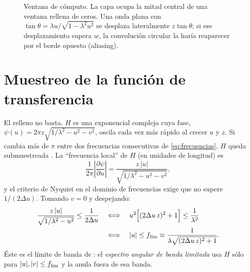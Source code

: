 \begin{figure}[htb]
\centering
{}
\caption[Ventana de cómputo y límite de banda]{Ventana de cómputo. La capa ocupa la mitad
central de una ventana rellena de ceros. Una onda plana con $\tan\theta=\lambda u/\sqrt{1-\lambda^2u^2}$ se
desplaza lateralmente $z\tan\theta$; si ese desplazamiento supera $w$, la convolución circular
la haría reaparecer por el borde opuesto (aliasing).}
\label{fig:ventana}
\end{figure}

\section{Muestreo de la función de transferencia}\label{sec:aliasing}

El relleno no basta. $H$ es una exponencial compleja cuya fase,
$\psi(u)=2\pi z\sqrt{1/\lambda^2-u^2-v^2}$, oscila cada vez más rápido al crecer $u$ y $z$. Si
cambia más de $\pi$ entre dos frecuencias consecutivas de \eqref{eq:frecuencias}, $H$ queda
submuestreada \parencite{voelz2009}. La ``frecuencia local'' de $H$ (en unidades de
longitud) es
\begin{equation}
  \frac{1}{2\pi}\left|\frac{\partial\psi}{\partial u}\right|
  =\frac{z\,|u|}{\sqrt{1/\lambda^2-u^2-v^2}} ,
  \label{eq:frec-local}
\end{equation}
y el criterio de Nyquist en el dominio de frecuencias exige que no supere $1/(2\Delta u)$.
Tomando $v=0$ y despejando:
\begin{align}
  \frac{z\,|u|}{\sqrt{1/\lambda^2-u^2}}\le\frac{1}{2\Delta u}
  \quad&\Longleftrightarrow\quad
  u^2\Bigl[(2\Delta u\,z)^2+1\Bigr]\le\frac{1}{\lambda^2}\nonumber\\
  &\Longleftrightarrow\quad
  |u|\le f_{\lim}\equiv\frac{1}{\lambda\sqrt{(2\Delta u\,z)^2+1}} .
  \label{eq:flim}
\end{align}
Éste es el límite de banda de \textcite{matsushima2009}: el \emph{espectro angular de banda
limitada} usa $H$ sólo para $|u|,|v|\le f_{\lim}$ y la anula fuera de esa banda.

